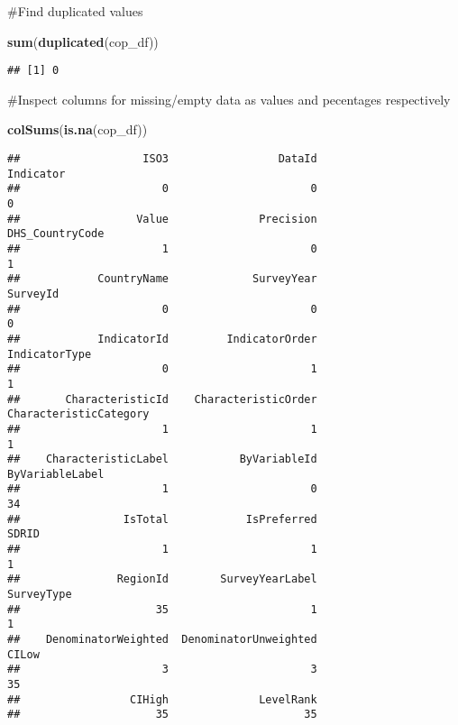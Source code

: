 \documentclass[
]{article}
\newenvironment{Shaded}{\begin{snugshade}}{\end{snugshade}}
\newcommand{\FunctionTok}[1]{\textcolor[rgb]{0.13,0.29,0.53}{\textbf{#1}}}
\newcommand{\NormalTok}[1]{#1}
\begin{document}
\#Find duplicated values

\begin{Shaded}
\begin{Highlighting}[]
\FunctionTok{sum}\NormalTok{(}\FunctionTok{duplicated}\NormalTok{(cop\_df))}
\end{Highlighting}
\end{Shaded}

\begin{verbatim}
## [1] 0
\end{verbatim}

\#Inspect columns for missing/empty data as values and pecentages
respectively

\begin{Shaded}
\begin{Highlighting}[]
\FunctionTok{colSums}\NormalTok{(}\FunctionTok{is.na}\NormalTok{(cop\_df))}
\end{Highlighting}
\end{Shaded}

\begin{verbatim}
##                   ISO3                 DataId              Indicator 
##                      0                      0                      0 
##                  Value              Precision        DHS_CountryCode 
##                      1                      0                      1 
##            CountryName             SurveyYear               SurveyId 
##                      0                      0                      0 
##            IndicatorId         IndicatorOrder          IndicatorType 
##                      0                      1                      1 
##       CharacteristicId    CharacteristicOrder CharacteristicCategory 
##                      1                      1                      1 
##    CharacteristicLabel           ByVariableId        ByVariableLabel 
##                      1                      0                     34 
##                IsTotal            IsPreferred                  SDRID 
##                      1                      1                      1 
##               RegionId        SurveyYearLabel             SurveyType 
##                     35                      1                      1 
##    DenominatorWeighted  DenominatorUnweighted                  CILow 
##                      3                      3                     35 
##                 CIHigh              LevelRank 
##                     35                     35
\end{verbatim}
\end{document}
